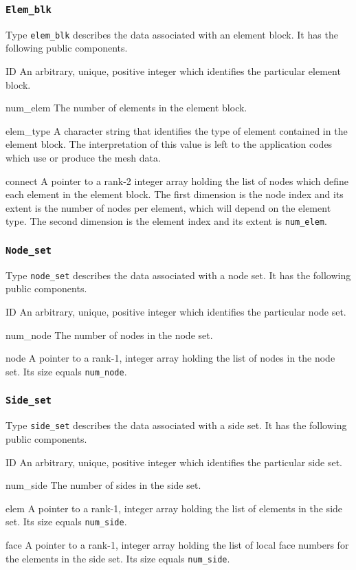 \documentclass[oneside,12pt]{amsart}
\newenvironment{ttlist}[1]%
  {\begin{list}{}{\renewcommand{\makelabel}[1]{\hfil\ttfamily ##1}%
    \settowidth{\labelsep}{\quad} \setlength{\itemsep}{\parskip}%
    \settowidth{\labelwidth}{\ttfamily #1}%
    \setlength{\leftmargin}{\labelwidth+2\labelsep}%
    \setlength{\listparindent}{0pt}}}%
  {\end{list}}
\begin{document}
\subsubsection{\texttt{Elem_blk}}
Type \texttt{elem_blk} describes the data associated with an element block.
It has the following public components.
\begin{ttlist}{elem_type}
\item[ID] An arbitrary, unique, positive integer which identifies the
  particular element block.
\item[num_elem] The number of elements in the element block.
\item[elem_type] A character string that identifies the type of element
  contained in the element block.  The interpretation of this value is
  left to the application codes which use or produce the mesh data.
\item[connect] A pointer to a rank-2 integer array holding the list of nodes
  which define each element in the element block.  The first dimension is the
  node index and its extent is the number of nodes per element, which will
  depend on the element type.  The second dimension is the element index and
  its extent is \texttt{num_elem}.
\end{ttlist}


\subsubsection{\texttt{Node_set}}
Type \texttt{node_set} describes the data associated with a node set.
It has the following public components.
\begin{ttlist}{elem_type}
\item[ID] An arbitrary, unique, positive integer which identifies the
  particular node set.
\item[num_node] The number of nodes in the node set.
\item[node] A pointer to a rank-1, integer array holding the list of
  nodes in the node set.  Its size equals \texttt{num_node}.
\end{ttlist}

\subsubsection{\texttt{Side_set}}
Type \texttt{side_set} describes the data associated with a side set.
It has the following public components.
\begin{ttlist}{elem_type}
\item[ID] An arbitrary, unique, positive integer which identifies the
  particular side set.
\item[num_side] The number of sides in the side set.
\item[elem] A pointer to a rank-1, integer array holding the list of
  elements in the side set.  Its size equals \texttt{num_side}.
\item[face] A pointer to a rank-1, integer array holding the list of 
  local face numbers for the elements in the side set.  Its size
  equals \texttt{num_side}.
\end{ttlist}
\end{document}
